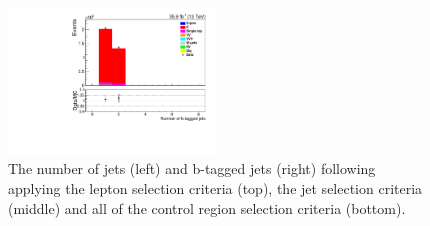 \begin{figure}[ht]
\includegraphics[width=0.49\textwidth]{figs/background-estimation/plots/unblinded/ttbar_control/numbBJets_SingleTop_wMass_emu.pdf}
\caption{
The number of jets (left) and b-tagged jets (right) following applying the lepton selection criteria (top), the jet selection criteria (middle) and all of the \ttbar control region selection criteria (bottom).
}
\label{fig:ttbar_nJets}
\end{figure}

